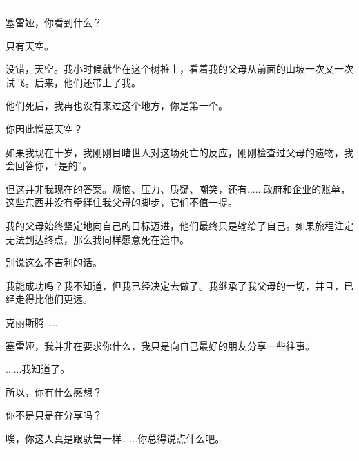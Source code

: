 \documentclass[openany]{book}
\begin{document}
\par\noindent\rule{\textwidth}{0.4pt}
塞雷娅，你看到什么？\par
只有天空。\par
没错，天空。我小时候就坐在这个树桩上，看着我的父母从前面的山坡一次又一次试飞。后来，他们还带上了我。\par
他们死后，我再也没有来过这个地方，你是第一个。\par
你因此憎恶天空？\par
如果我现在十岁，我刚刚目睹世人对这场死亡的反应，刚刚检查过父母的遗物，我会回答你，“是的”。\par
但这并非我现在的答案。烦恼、压力、质疑、嘲笑，还有......政府和企业的账单，这些东西并没有牵绊住我父母的脚步，它们不值一提。\par
我的父母始终坚定地向自己的目标迈进，他们最终只是输给了自己。如果旅程注定无法到达终点，那么我同样愿意死在途中。\par
别说这么不吉利的话。\par
我能成功吗？我不知道，但我已经决定去做了。我继承了我父母的一切，并且，已经走得比他们更远。\par
克丽斯腾......\par
塞雷娅，我并非在要求你什么，我只是向自己最好的朋友分享一些往事。\par
......我知道了。\par
所以，你有什么感想？\par
你不是只是在分享吗？\par
唉，你这人真是跟驮兽一样......你总得说点什么吧。
\par\noindent\rule{\textwidth}{0.4pt}
\end{document}
